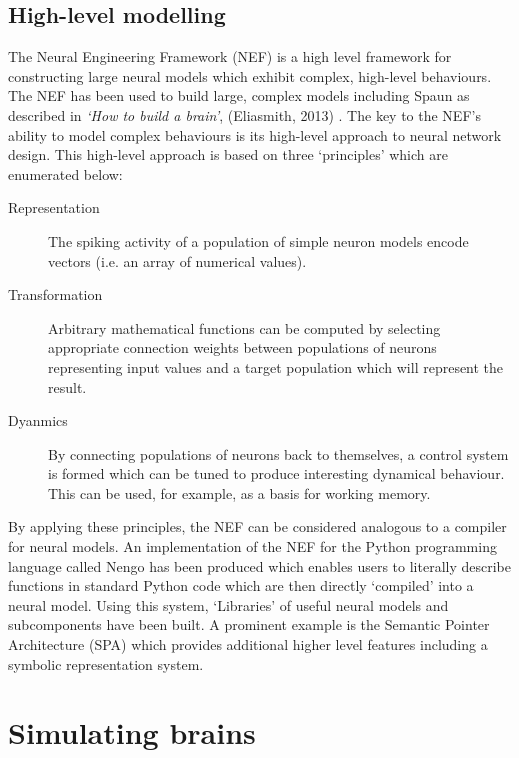 		\subsection{High-level modelling}
			
			The Neural Engineering Framework (NEF) \cite{eliasmith04} is a high level
			framework for constructing large neural models which exhibit complex,
			high-level behaviours. The NEF has been used to build large, complex
			models including Spaun as described in \emph{`How to build a brain'},
			(Eliasmith, 2013) \cite{eliasmith13}. The key to the NEF's ability to
			model complex behaviours is its high-level approach to neural network
			design. This high-level approach is based on three `principles' which are
			enumerated below:
			
			\begin{description}
				
				\item[Representation] The spiking activity of a population of simple
				neuron models encode vectors (i.e. an array of numerical values).
				
				\item[Transformation] Arbitrary mathematical functions can be computed
				by selecting appropriate connection weights between populations of
				neurons representing input values and a target population which will
				represent the result.
				
				\item[Dyanmics] By connecting populations of neurons back to themselves,
				a control system is formed which can be tuned to produce interesting
				dynamical behaviour. This can be used, for example, as a basis for
				working memory.
				
			\end{description}
			
			By applying these principles, the NEF can be considered analogous to a
			compiler for neural models. An implementation of the NEF for the Python
			programming language called Nengo has been produced which enables users to
			literally describe functions in standard Python code which are then
			directly `compiled' into a neural model. Using this system, `Libraries' of
			useful neural models and subcomponents have been built. A prominent
			example is the Semantic Pointer Architecture (SPA) \cite{eliasmith13}
			which provides additional higher level features including a symbolic
			representation system.
		
	
	\section{Simulating brains}
		
